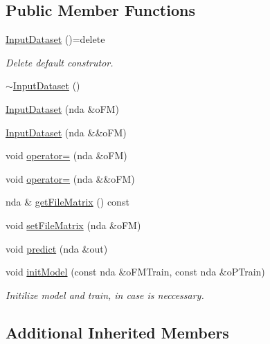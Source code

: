 \subsection*{Public Member Functions}
\begin{DoxyCompactItemize}
\item 
\mbox{\label{classmodel__api_1_1InputDataset_a410e07ea3fe528370ff45f7e1833f5ec}} 
\hyperlink{classmodel__api_1_1InputDataset_a410e07ea3fe528370ff45f7e1833f5ec}{Input\+Dataset} ()=delete
\begin{DoxyCompactList}\small\item\em Delete default construtor. \end{DoxyCompactList}\item 
\hyperlink{classmodel__api_1_1InputDataset_a31f12b83db2195f609dfc8af27cdbc58}{$\sim$\+Input\+Dataset} ()
\item 
\hyperlink{classmodel__api_1_1InputDataset_a5fd9fc18bbd147d612acb16a808a135c}{Input\+Dataset} (nda \&o\+FM)
\item 
\hyperlink{classmodel__api_1_1InputDataset_a213885343387992b05a173ecb70a628f}{Input\+Dataset} (nda \&\&o\+FM)
\item 
void \hyperlink{classmodel__api_1_1InputDataset_a59c9f5a14675794a67ef0eafa7550d8d}{operator=} (nda \&o\+FM)
\item 
void \hyperlink{classmodel__api_1_1InputDataset_a192c20a95f93e03b4c4adb07e8e5e077}{operator=} (nda \&\&o\+FM)
\item 
nda \& \hyperlink{classmodel__api_1_1InputDataset_a853b380f548e21ee7421f887b9be2722}{get\+File\+Matrix} () const
\item 
void \hyperlink{classmodel__api_1_1InputDataset_a71111535a17422db1f0fdbe2ac6ce1c8}{set\+File\+Matrix} (nda \&o\+FM)
\item 
void \hyperlink{classmodel__api_1_1InputDataset_af25824b44f866ff2b03e5d1036d7215a}{predict} (nda \&out)
\item 
void \hyperlink{classmodel__api_1_1InputDataset_af7d130afc8889825573e738906397714}{init\+Model} (const nda \&o\+F\+M\+Train, const nda \&o\+P\+Train)
\begin{DoxyCompactList}\small\item\em Initilize model and train, in case is neccessary. \end{DoxyCompactList}\end{DoxyCompactItemize}
\subsection*{Additional Inherited Members}


